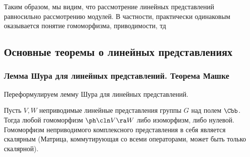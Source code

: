 \documentclass[a4paper]{article}
\begin{document}
Таким образом, мы видим, что рассмотрение линейных представлений равносильно рассмотрению модулей.  В
частности, практически одинаковым оказывается понятие гомоморфизма, приводимости, тд

\subsection{Основные теоремы о линейных представлениях}

\subsubsection{Лемма Шура для линейных представлений. Теорема Машке}

Переформулируем лемму Шура для линейных представлений.
\begin{lemma}
Пусть $V, W$ неприводимые линейные представления группы $G$ над полем $\Cbb$. Тогда любой гомоморфизм
$\ph\cln V \ra W$ либо изоморфизм, либо нулевой. Гомоморфизм неприводимого комплексного представления в себя
является скалярным (Матрица, коммутирующая со всеми операторами, может быть только скалярной).
\end{lemma}
\end{document}
